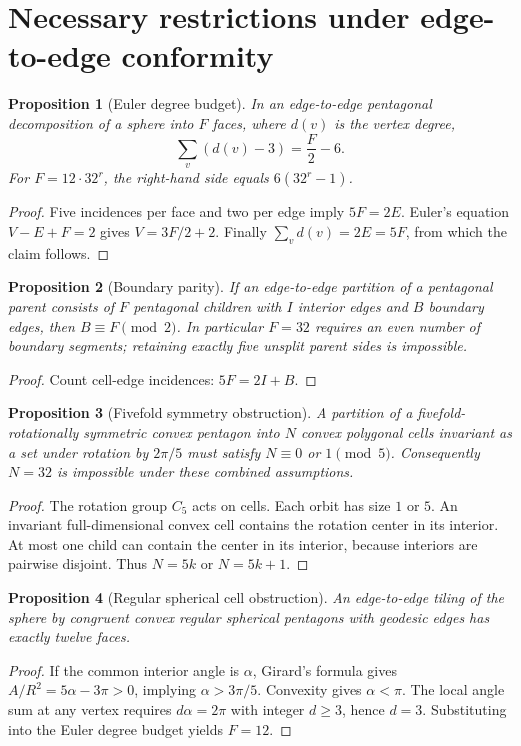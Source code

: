 \documentclass[11pt,a4paper]{article}
\newtheorem{proposition}{Proposition}
\begin{document}
\section{Necessary restrictions under edge-to-edge conformity}
\begin{proposition}[Euler degree budget]
In an edge-to-edge pentagonal decomposition of a sphere into $F$
faces, where $d(v)$ is the vertex degree,
\begin{equation}
\sum_v (d(v)-3) = \frac{F}{2}-6.
\end{equation}
For $F=12\cdot32^r$, the right-hand side equals $6(32^r-1)$.
\end{proposition}
\begin{proof}
Five incidences per face and two per edge imply $5F=2E$.
Euler's equation $V-E+F=2$ gives $V=3F/2+2$.
Finally $\sum_vd(v)=2E=5F$, from which the claim follows.
\end{proof}

\begin{proposition}[Boundary parity]
If an edge-to-edge partition of a pentagonal parent consists of
$F$ pentagonal children with $I$ interior edges and $B$ boundary
edges, then $B\equiv F\pmod2$. In particular $F=32$ requires an
even number of boundary segments; retaining exactly five unsplit
parent sides is impossible.
\end{proposition}
\begin{proof}
Count cell-edge incidences: $5F=2I+B$.
\end{proof}

\begin{proposition}[Fivefold symmetry obstruction]
A partition of a fivefold-rotationally symmetric convex pentagon
into $N$ convex polygonal cells invariant as a set under rotation
by $2\pi/5$ must satisfy $N\equiv0$ or $1\pmod5$.
Consequently $N=32$ is impossible under these combined assumptions.
\end{proposition}
\begin{proof}
The rotation group $C_5$ acts on cells. Each orbit has size $1$
or $5$. An invariant full-dimensional convex cell contains the
rotation center in its interior. At most one child can contain the
center in its interior, because interiors are pairwise disjoint.
Thus $N=5k$ or $N=5k+1$.
\end{proof}

\begin{proposition}[Regular spherical cell obstruction]
An edge-to-edge tiling of the sphere by congruent convex regular
spherical pentagons with geodesic edges has exactly twelve faces.
\end{proposition}
\begin{proof}
If the common interior angle is $\alpha$, Girard's formula gives
$A/R^2=5\alpha-3\pi>0$, implying $\alpha>3\pi/5$.
Convexity gives $\alpha<\pi$. The local angle sum at any vertex
requires $d\alpha=2\pi$ with integer $d\geq3$, hence $d=3$.
Substituting into the Euler degree budget yields $F=12$.
\end{proof}
\end{document}
